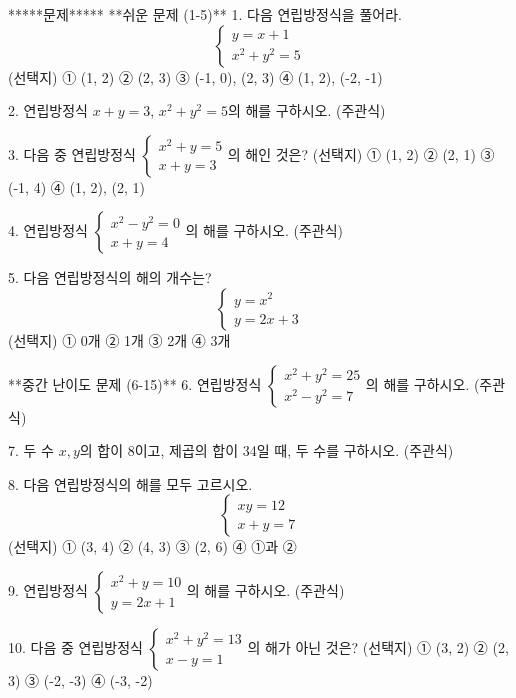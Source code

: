 \documentclass[fleqn]{article}
\begin{document}
      
    *****문제*****  
**쉬운 문제 (1-5)**  
1. 다음 연립방정식을 풀어라.  
   \[
   \begin{cases} 
   y = x + 1 \\ 
   x^2 + y^2 = 5 
   \end{cases}
   \]  
   (선택지) ① (1, 2) ② (2, 3) ③ (-1, 0), (2, 3) ④ (1, 2), (-2, -1)  

2. 연립방정식 \(x + y = 3\), \(x^2 + y^2 = 5\)의 해를 구하시오. (주관식)  

3. 다음 중 연립방정식 \(\begin{cases} x^2 + y = 5 \\ x + y = 3 \end{cases}\)의 해인 것은?  
   (선택지) ① (1, 2) ② (2, 1) ③ (-1, 4) ④ (1, 2), (2, 1)  

4. 연립방정식 \(\begin{cases} x^2 - y^2 = 0 \\ x + y = 4 \end{cases}\)의 해를 구하시오. (주관식)  

5. 다음 연립방정식의 해의 개수는?  
   \[
   \begin{cases} 
   y = x^2 \\ 
   y = 2x + 3 
   \end{cases}
   \]  
   (선택지) ① 0개 ② 1개 ③ 2개 ④ 3개  

**중간 난이도 문제 (6-15)**  
6. 연립방정식 \(\begin{cases} x^2 + y^2 = 25 \\ x^2 - y^2 = 7 \end{cases}\)의 해를 구하시오. (주관식)  

7. 두 수 \(x, y\)의 합이 8이고, 제곱의 합이 34일 때, 두 수를 구하시오. (주관식)  

8. 다음 연립방정식의 해를 모두 고르시오.  
   \[
   \begin{cases} 
   xy = 12 \\ 
   x + y = 7 
   \end{cases}
   \]  
   (선택지) ① (3, 4) ② (4, 3) ③ (2, 6) ④ ①과 ②  

9. 연립방정식 \(\begin{cases} x^2 + y = 10 \\ y = 2x + 1 \end{cases}\)의 해를 구하시오. (주관식)  

10. 다음 중 연립방정식 \(\begin{cases} x^2 + y^2 = 13 \\ x - y = 1 \end{cases}\)의 해가 아닌 것은?  
    (선택지) ① (3, 2) ② (2, 3) ③ (-2, -3) ④ (-3, -2)  
\end{document}
